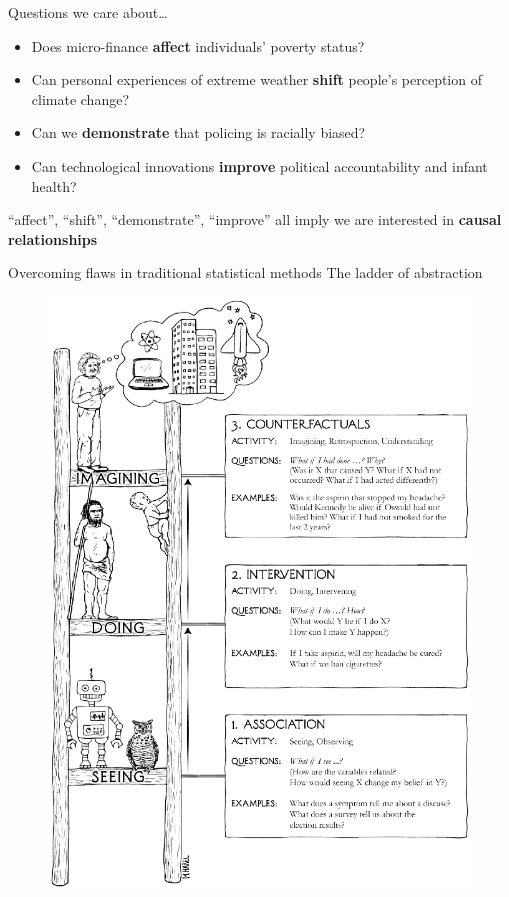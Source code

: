 \documentclass[12pt,english,dvipsnames,aspectratio=169, handout]{beamer}
\begin{document}
\begin{frame}{Questions we care about\ldots}
\begin{itemize}
	\item Does micro-finance \textbf{affect} individuals' poverty status?
	\item Can personal experiences of extreme weather \textbf{shift} people's perception of climate change?
	\item Can we \textbf{demonstrate} that policing is racially biased?
	\item Can technological innovations \textbf{improve} political accountability and infant health?
\end{itemize}
``affect'', ``shift'', ``demonstrate'', ``improve'' all imply we are interested in \textbf{causal relationships}
\end{frame}

\begin{frame}{Overcoming flaws in traditional statistical methods}
The ladder of abstraction \cite{pearl_book_2018}
    \begin{figure}
    \includegraphics[height=.75\textheight]{../04-figures/01/01-Pearl2018Ladder}
    \end{figure}
\end{frame}
\end{document}
